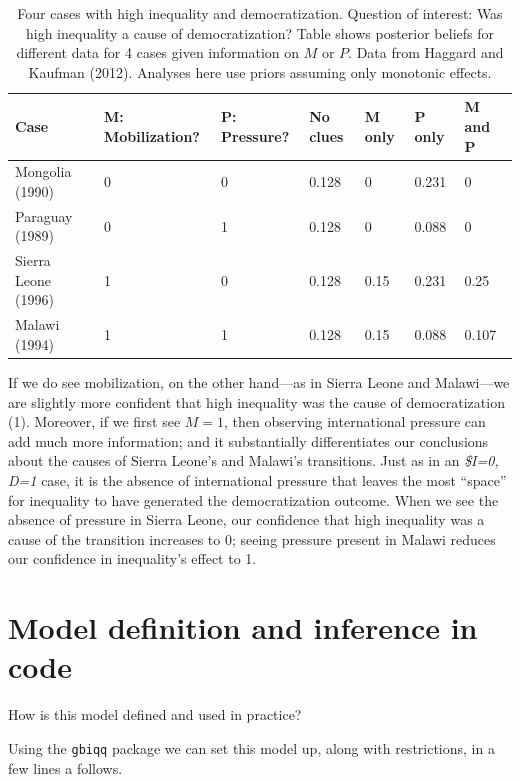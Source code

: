 \documentclass[
  12pt,
]{book}
\begin{document}
\begin{table}

\caption{\label{tab:HK8cases2}Four cases with high inequality and  democratization. Question of interest: Was high inequality a cause of democratization? Table shows posterior beliefs for different data for 4 cases given information on $M$ or $P$. Data from Haggard and Kaufman (2012). Analyses here use priors assuming only monotonic effects.}
\centering
\begin{tabular}[t]{l|l|l|l|l|l|l}
\hline
Case & M: Mobilization? & P: Pressure? & No clues & M only & P only & M and P\\
\hline
Mongolia (1990) & 0 & 0 & 0.128 & 0 & 0.231 & 0\\
\hline
Paraguay (1989) & 0 & 1 & 0.128 & 0 & 0.088 & 0\\
\hline
Sierra Leone (1996) & 1 & 0 & 0.128 & 0.15 & 0.231 & 0.25\\
\hline
Malawi (1994) & 1 & 1 & 0.128 & 0.15 & 0.088 & 0.107\\
\hline
\end{tabular}
\end{table}

If we do see mobilization, on the other hand---as in Sierra Leone and Malawi---we are slightly more confident that high inequality was the cause of democratization (1). Moreover, if we first see \(M=1\), then observing international pressure can add much more information; and it substantially differentiates our conclusions about the causes of Sierra Leone's and Malawi's transitions. Just as in an \emph{\$I=0, D=1} case, it is the absence of international pressure that leaves the most ``space'' for inequality to have generated the democratization outcome. When we see the absence of pressure in Sierra Leone, our confidence that high inequality was a cause of the transition increases to 0; seeing pressure present in Malawi reduces our confidence in inequality's effect to 1.

\hypertarget{model-definition-and-inference-in-code}{%
\section{Model definition and inference in code}\label{model-definition-and-inference-in-code}}

How is this model defined and used in practice?

Using the \texttt{gbiqq} package we can set this model up, along with restrictions, in a few lines a follows.
\end{document}

